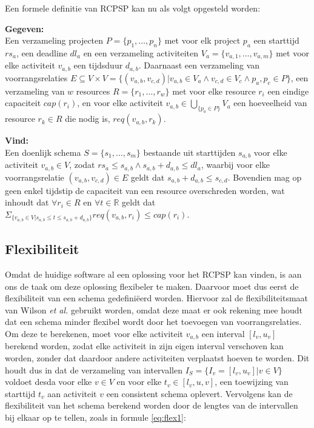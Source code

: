 Een formele definitie van RCPSP kan nu als volgt opgesteld worden:

\textbf{Gegeven:}\\
Een verzameling projecten $P = \{p_1, \dots ,p_n\}$ met voor elk project $p_a$ een starttijd $rs_a$, een deadline $dl_a$ en een verzameling activiteiten $V_a = \{v_{a,1},\dots ,v_{a,m}\}$ met voor elke activiteit $v_{a,b}$ een tijdsduur $d_{a,b}$. Daarnaast een verzameling van voorrangsrelaties $E \subseteq V \times V = \{(v_{a,b},v_{c,d}) | v_{a,b} \in V_a \wedge v_{c,d} \in V_c \wedge p_a,p_c \in P \}$, een verzameling van $w$ resources $R = \{r_1, \dots ,r_w\}$ met voor elke resource $r_i$ een eindige capaciteit $cap(r_i)$, en voor elke activiteit $v_{a,b} \in \bigcup_{\{p_a \in P\}} V_a$ een hoeveelheid van resource $r_k \in R$ die nodig is, $req(v_{a,b},r_k)$.

\textbf{Vind:}\\
Een doenlijk schema $S = \{s_1,\dots ,s_m\}$ bestaande uit starttijden $s_{a,b}$ voor elke activiteit $v_{a,b} \in V$, zodat $rs_a \leq s_{a,b} \wedge s_{a,b} + d_{a,b} \leq dl_a$, waarbij voor elke voorrangsrelatie $(v_{a,b},v_{c,d}) \in E$ geldt dat $s_{a,b} + d_{a,b} \leq s_{c,d}$. Bovendien mag op geen enkel tijdstip de capaciteit van een resource overschreden worden, wat inhoudt dat $\forall r_i \in R$ en $\forall t \in \mathbb{R}$ geldt dat $\Sigma _{\{v_{a,b} \in V | s_{a,b} \leq t \leq s_{a,b} + d_{a,b}\}} req(v_{a,b},r_i) \leq cap(r_i)$.

\subsection{Flexibiliteit}
Omdat de huidige software al een oplossing voor het RCPSP kan vinden, is aan ons de taak om deze oplossing flexibeler te maken. Daarvoor moet dus eerst de flexibiliteit van een schema gedefini\"eerd worden. Hiervoor zal de flexibiliteitsmaat van Wilson \emph{et al.} \cite{wilson2013flexibility} gebruikt worden, omdat deze maat er ook rekening mee houdt dat een schema minder flexibel wordt door het toevoegen van voorrangsrelaties. Om deze te berekenen, moet voor elke activiteit $v_{a,b}$ een interval $[l_v,u_v]$ berekend worden, zodat elke activiteit in zijn eigen interval verschoven kan worden, zonder dat daardoor andere activiteiten verplaatst hoeven te worden. Dit houdt dus in dat de verzameling van intervallen $I_S = \{I_v = [l_v,u_v] | v \in V\}$ voldoet desda voor elke $v \in V$ en voor elke $t_v \in [l_v,u,v]$, een toewijzing van starttijd $t_v$ aan activiteit $v$ een consistent schema oplevert. Vervolgens kan de flexibiliteit van het schema berekend worden door de lengtes van de intervallen bij elkaar op te tellen, zoals in formule \ref{eq:flex1}:


